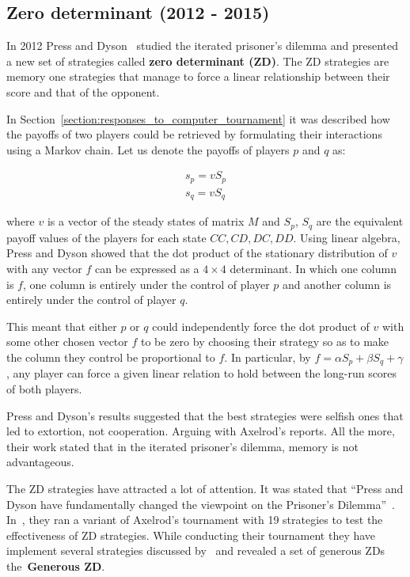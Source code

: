 \documentclass{article}
\theoremstyle{definition}
\begin{document}
\subsection{Zero determinant (2012 - 2015)}

In 2012 Press and Dyson~\cite{Press2012} studied the iterated prisoner's dilemma and presented
a new set of strategies called \textbf{zero determinant (ZD)}. The ZD strategies
are memory one strategies that manage to force a linear relationship between their
score and that of the opponent.

In Section~\ref{section:responses_to_computer_tournament} it was described how
the payoffs of two players could be retrieved by formulating their interactions
using a Markov chain. Let us denote the payoffs of players \(p\) and \(q\) as:

\begin{align*}
    s_p = v S_p \\
    s_q = v S_q
\end{align*}

where \(v\) is a vector of the steady states of matrix \(M\) and \(S_p\), \(S_q\)
are the equivalent payoff values of the players for each state \(CC, CD, DC, DD\).
Using linear algebra, Press and Dyson showed that the dot product of the stationary
distribution of \(v\) with any vector \(f\) can be expressed as a \(4\times 4\)
determinant. In which one column is \(f\), one column is entirely under the control
of player \(p\) and another column is entirely under the control of player \(q\).

This meant that either \(p\) or \(q\) could independently force the dot product
of \(v\) with some other chosen vector \(f\) to be zero by choosing their
strategy so as to make the column they control be proportional to \(f\).
In particular, by \( f = \alpha S_p + \beta S_q + \gamma\), any player can force
a given linear relation to hold between the long-run scores of both players.

Press and Dyson's results suggested that the best strategies were selfish ones
that led to extortion, not cooperation. Arguing with Axelrod's reports.
All the more, their work stated that in the iterated prisoner's dilemma, memory
is not advantageous.

The ZD strategies have attracted a lot of attention. It was stated that
``Press and Dyson have fundamentally changed the viewpoint on the Prisoner's
Dilemma''~\cite{Stewart2012}. In~\cite{Stewart2012}, they ran a variant of
Axelrod's tournament with 19 strategies to test the effectiveness of 
ZD strategies. While conducting their tournament they have implement several
strategies discussed by~\cite{Press2012} and revealed a set of generous ZDs
the~\textbf{Generous ZD}.
\end{document}
